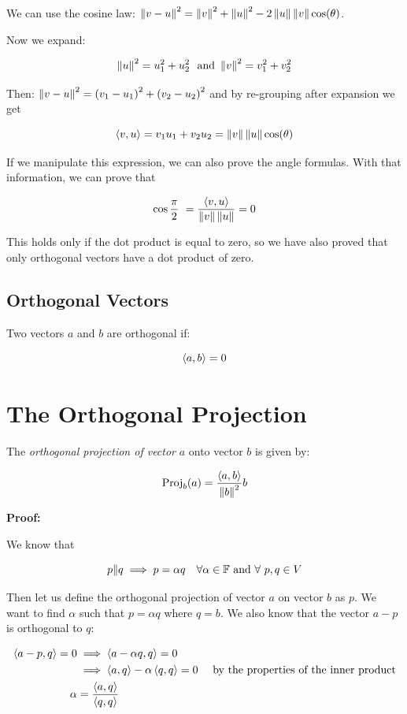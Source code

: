 We can use the cosine law: \(\left\| v - u \right\|^{2} = \left\| v \right\|^2 + \left\| u \right\|^2  - 2 \left\| u \right\| \left\| v \right\| \cos(\theta)\).

Now we expand:

\[
	\metric{u}^{2} = u_{1}^2 + u_{2}^2\ \text{ and } \metric{v}^{2} = v_{1}^2 + v_{2}^2
\]

Then: \(\left\| v - u \right\|^2 = {(v_1 - u_1)}^2 + {(v_2 - u_2)}^2\) and by re-grouping after expansion we get

\[
	\left\langle v, u\right\rangle = v_1u_1 + v_2u_2 = \left\| v \right\|\left\| u \right\|\cos (\theta) \\ 
\]

\QED

If we manipulate this expression, we can also prove the angle formulas.
With that information, we can prove that

\[
	\cos \frac{\pi}{2}\ = \frac{\left\langle v, u\right\rangle}{\left\| v \right\|\left\| u \right\|} = 0
\]

This holds only if the dot product is equal to zero, so we have also proved that
only orthogonal vectors have a dot product of zero.

\subsection{Orthogonal Vectors}

Two vectors \(a\) and \(b\) are orthogonal if:

\[
	\left\langle a, b\right\rangle = 0
\]

\section{The Orthogonal Projection}

The \emph{orthogonal projection of vector} \(a\) onto vector \(b\) is given by:

\[
	\mathrm{Proj}_{b}(a) = \frac{\left\langle a, b\right\rangle}{\left\| b \right\|^2} b
\]

\textbf{Proof:}

We know that 

\[
	p \| q \implies p = \alpha q \quad \forall \alpha \in \mathbb{F}\ \text{and}\ \forall\ p, q \in V
\]

Then let us define the orthogonal projection of vector \(a\) on vector \(b\) as \(p\). 
We want to find \(\alpha\) such that \(p = \alpha q\) where \(q = b\). We also know that the vector \(a - p\) is orthogonal to \(q\):

\begin{align*}
	\left\langle a - p, q\right\rangle = 0 &\implies \left\langle a - \alpha q, q\right\rangle = 0 \\  
	&\implies \left\langle a, q\right\rangle - \alpha \left\langle q, q\right\rangle = 0 \quad \text{ by the properties of the inner product}\\
	\alpha &= \frac{\left\langle a, q\right\rangle}{\left\langle q, q\right\rangle}
\end{align*}

